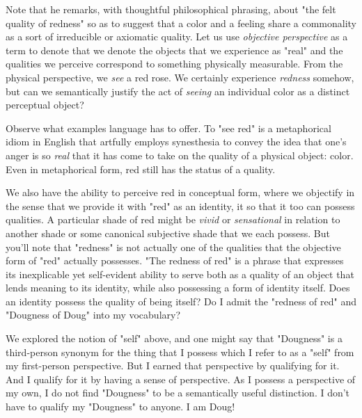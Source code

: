 \documentclass[runningheads]{llncs}
\begin{document}
Note that he remarks, with thoughtful philosophical phrasing, about "the felt quality of redness" so as to suggest that a color and a feeling share a commonality as a sort of irreducible or axiomatic quality. Let us use \textit{objective perspective} as a term to denote that we denote the objects that we experience as "real" and the qualities we perceive correspond to something physically measurable. From the physical perspective, we \textit{see} a red rose. We certainly experience \textit{redness} somehow, but can we semantically justify the act of \textit{seeing} an individual color as a distinct perceptual object?

Observe what examples language has to offer. To "see red" is a metaphorical idiom in English that artfully employs synesthesia to convey the idea that one's anger is so \textit{real} that it has come to take on the quality of a physical object: color. Even in metaphorical form, red still has the status of a quality. 

We also have the ability to perceive red in conceptual form, where we objectify in the sense that we provide it with "red" as an identity, it so that it too can possess qualities. A particular shade of red might be \emph{vivid} or \emph{sensational} in relation to another shade or some canonical subjective shade that we each possess. But you'll note that "redness" is not actually one of the qualities that the objective form of "red" actually possesses. "The redness of red" is a phrase that expresses its inexplicable yet self-evident ability to serve both as a quality of an object that lends meaning to its identity, while also possessing a form of identity itself. Does an identity possess the quality of being itself? Do I admit the "redness of red" and "Dougness of Doug" into my vocabulary?

We explored the notion of "self" above, and one might say that "Dougness" is a third-person synonym for the thing that I possess which I refer to as a "self" from my first-person perspective. But I earned that perspective by qualifying for it. And I qualify for it by having a sense of perspective. As I possess a perspective of my own, I do not find "Dougness" to be a semantically useful distinction. I don't have to qualify my "Dougness" to anyone. I am Doug! 
\end{document}
